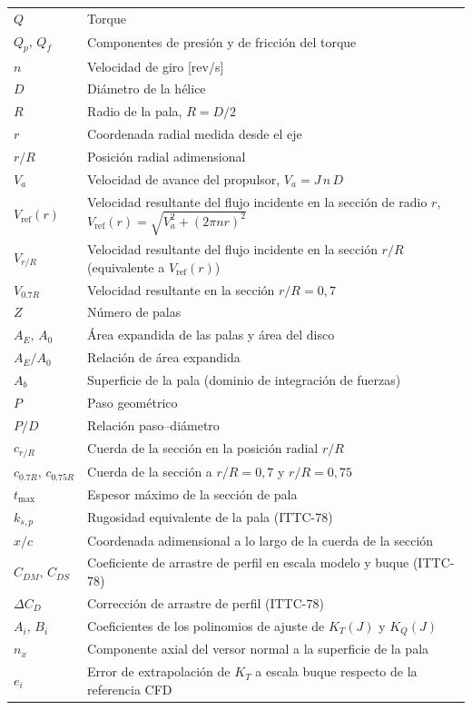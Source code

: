 \begin{longtable}{@{}p{} p{}@{}}
$Q$         & Torque \\
$Q_p,\,Q_f$ & Componentes de presión y de fricción del torque \\
$n$         & Velocidad de giro [rev/s] \\
$D$         & Diámetro de la hélice \\
$R$         & Radio de la pala, $R = D/2$ \\
$r$         & Coordenada radial medida desde el eje \\
$r/R$       & Posición radial adimensional \\
$V_a$       & Velocidad de avance del propulsor, $V_a = J\,n\,D$ \\
$V_{\text{ref}}(r)$ & Velocidad resultante del flujo incidente en la sección de radio $r$, $V_{\text{ref}}(r)=\sqrt{V_a^2+(2\pi n r)^2}$ \\
$V_{r/R}$   & Velocidad resultante del flujo incidente en la sección $r/R$ (equivalente a $V_{\text{ref}}(r)$) \\
$V_{0.7R}$  & Velocidad resultante en la sección $r/R=0{,}7$ \\
$Z$         & Número de palas \\
$A_E,\,A_0$ & Área expandida de las palas y área del disco \\
$A_E/A_0$   & Relación de área expandida \\
$A_b$       & Superficie de la pala (dominio de integración de fuerzas) \\
$P$         & Paso geométrico \\
$P/D$       & Relación paso--diámetro \\
$c_{r/R}$   & Cuerda de la sección en la posición radial $r/R$ \\
$c_{0.7R},\,c_{0.75R}$ & Cuerda de la sección a $r/R=0{,}7$ y $r/R=0{,}75$ \\
$t_{\max}$  & Espesor máximo de la sección de pala \\
$k_{s,p}$   & Rugosidad equivalente de la pala (ITTC-78) \\
$x/c$       & Coordenada adimensional a lo largo de la cuerda de la sección \\
$C_{DM},\,C_{DS}$ & Coeficiente de arrastre de perfil en escala modelo y buque (ITTC-78) \\
$\Delta C_D$& Corrección de arrastre de perfil (ITTC-78) \\
$A_i,\,B_i$ & Coeficientes de los polinomios de ajuste de $K_T(J)$ y $K_Q(J)$ \\
$n_x$       & Componente axial del versor normal a la superficie de la pala \\
$e_i$       & Error de extrapolación de $K_T$ a escala buque respecto de la referencia CFD \\
\end{longtable}


